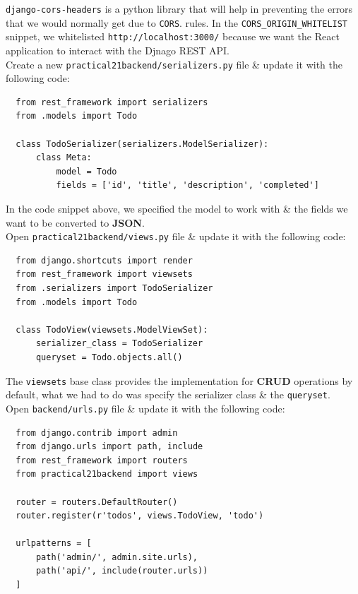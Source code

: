 \documentclass{article}
\begin{document}
\texttt{django-cors-headers} is a python library that will help in preventing the errors that we would normally get due to \texttt{CORS}. rules. In the \texttt{CORS\_ORIGIN\_WHITELIST} snippet, we whitelisted \texttt{http://localhost:3000/} because we want the React application to interact with the Djnago REST API. \\

Create a new \texttt{practical21backend/serializers.py} file \& update it with the following code:

\begin{verbatim}
  from rest_framework import serializers
  from .models import Todo

  class TodoSerializer(serializers.ModelSerializer):
      class Meta:
          model = Todo
          fields = ['id', 'title', 'description', 'completed']
\end{verbatim}

In the code snippet above, we specified the model to work with \& the fields we want to be converted to \textbf{JSON}. \\

Open \texttt{practical21backend/views.py} file \& update it with the following code:

\begin{verbatim}
  from django.shortcuts import render
  from rest_framework import viewsets          
  from .serializers import TodoSerializer      
  from .models import Todo                     

  class TodoView(viewsets.ModelViewSet):       
      serializer_class = TodoSerializer          
      queryset = Todo.objects.all()              
\end{verbatim}

The \texttt{viewsets} base class provides the implementation for \textbf{CRUD} operations by default, what we had to do was specify the serializer class \& the \texttt{queryset}. \\

Open \texttt{backend/urls.py} file \& update it with the following code:

\begin{verbatim}
  from django.contrib import admin
  from django.urls import path, include                
  from rest_framework import routers                   
  from practical21backend import views                            

  router = routers.DefaultRouter()                  
  router.register(r'todos', views.TodoView, 'todo') 

  urlpatterns = [
      path('admin/', admin.site.urls),         
      path('api/', include(router.urls))               
  ]
\end{verbatim}
\end{document}

